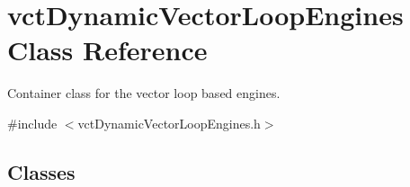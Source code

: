 \hypertarget{classvct_dynamic_vector_loop_engines}{}\section{vct\+Dynamic\+Vector\+Loop\+Engines Class Reference}
\label{classvct_dynamic_vector_loop_engines}


Container class for the vector loop based engines.  




{\ttfamily \#include $<$vct\+Dynamic\+Vector\+Loop\+Engines.\+h$>$}

\subsection*{Classes}
